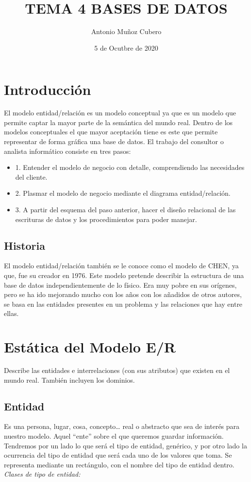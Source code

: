 \documentclass{article}
\title{TEMA 4 BASES DE DATOS}
\author{Antonio Muñoz Cubero}
\date{5 de Ocutbre de 2020}
\begin{document}
\maketitle
{}

\newpage

    \tableofcontents

\newpage
\section{Introducción}
El modelo entidad/relación es un modelo conceptual ya que es un modelo que permite captar la mayor parte de la semántica del mundo real.
Dentro de los modelos conceptuales el que mayor aceptación tiene es este que permite representar de forma gráfica una base de datos. El trabajo del 
consultor o analista informático consiste en tres pasos:
\begin{itemize}

    \item 1. Entender el modelo de negocio con detalle, comprendiendo las necesidades del cliente.
    \item 2. Plasmar el modelo de negocio mediante el diagrama entidad/relación.
    \item 3. A partir del esquema del paso anterior, hacer el diseño relacional de las escrituras de datos y los procedimientos para poder manejar.

\end{itemize}

\subsection{Historia}
El modelo entidad/relación también se le conoce como el modelo de CHEN, ya que, fue su creador en 1976. Este modelo pretende describir la estructura de 
una base de datos independientemente de lo físico. Era muy pobre en sus orígenes, pero se ha ido mejorando mucho con los años con los añadidos de otros 
autores, se basa en las entidades presentes en un problema y las relaciones que hay entre ellas.

\section{Estática del Modelo E/R}
Describe las entidades e interrelaciones (con sus atributos) que existen en el mundo real. También incluyen los dominios.

\subsection{Entidad}
Es una persona, lugar, cosa, concepto… real o abstracto que sea de interés para nuestro modelo. Aquel “ente” sobre el que queremos guardar información. 
Tendremos por un lado lo que será el tipo de entidad, genérico, y por otro lado la ocurrencia del tipo de entidad que será cada uno de los valores que toma.
Se representa mediante un rectángulo, con el nombre del tipo de entidad dentro.
\textit{Clases de tipo de entidad:}
\end{document}

